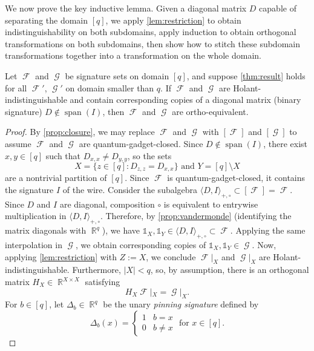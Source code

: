 \documentclass{theoretics}
\DeclareMathOperator{\spn}{span}
\DeclareMathOperator{\rr}{\mathbb{R}}
\DeclareMathOperator{\fc}{\mathcal{F}}
\DeclareMathOperator{\gc}{\mathcal{G}}
\begin{document}
We now prove the key inductive lemma. Given a diagonal matrix $D$ capable of separating the
domain $[q]$, we apply \autoref{lem:restriction} to obtain indistinguishability on both
subdomains, apply induction to obtain orthogonal transformations on both subdomains, then
show how to stitch these subdomain transformations together into a transformation on the
whole domain.
\begin{lemma}
    \label{lem:induction}
    Let $\fc$ and $\gc$ be signature sets on domain $[q]$, and suppose \autoref{thm:result} holds for
    all $\fc'$, $\gc'$ on domain smaller than $q$. If $\fc$ and $\gc$ are Holant-indistinguishable
    and contain corresponding copies of a diagonal matrix (binary signature)
    $D \not\in \spn(I)$, then $\fc$ and $\gc$ are ortho-equivalent. 
\end{lemma}
\begin{proof}
    By \autoref{prop:closure}, we may replace $\fc$ and $\gc$ with $[\fc]$ and $[\gc]$ to assume $\fc$
    and $\gc$ are quantum-gadget-closed.
    Since $D \not\in \spn(I)$, there exist $x,y \in [q]$ such that $D_{x,x} \neq D_{y,y}$,
    so the sets 
    \[
        X = \{z \in [q]: D_{z,z} = D_{x,x}\} \text{ and } Y = [q] \setminus X
    \]
    are a nontrivial partition of $[q]$. Since $\fc$ is quantum-gadget-closed, it contains 
    the signature $I$ of the wire. 
    Consider the subalgebra $\langle D,I\rangle_{+,\circ} \subset [\fc] = \fc$.
    Since $D$ and $I$ are diagonal, composition $\circ$ is equivalent to entrywise multiplication
    in $\langle D,I\rangle_{+,\circ}$. Therefore, by \autoref{prop:vandermonde} (identifying the
    matrix diagonals with $\rr^q$),
    we have $\mathds{1}_X, \mathds{1}_Y \in\langle D,I\rangle_{+,\circ} \subset \fc$.
    Applying the same interpolation in $\gc$, we obtain corresponding copies of 
    $\mathds{1}_X, \mathds{1}_Y \in \gc$. 
    Now, applying \autoref{lem:restriction} with $Z := X$, we conclude
    $\fc|_X$ and $\gc|_X$ are Holant-indistinguishable. Furthermore, $|X| < q$, so, by assumption,
    there is an orthogonal matrix $H_X \in \rr^{X \times X}$ satisfying 
    \begin{equation}
        H_X \fc|_X = \gc|_X.
        \label{eq:hx}
    \end{equation}
    For $b \in [q]$, let $\Delta_b \in \rr^q$ be the unary \emph{pinning signature} defined by
   \[\Delta_b(x) = 
      \begin{cases} 1 & b = x \\ 0 & b \neq x \end{cases} \text{ for } x \in [q].
\]
\end{proof}
\end{document}

